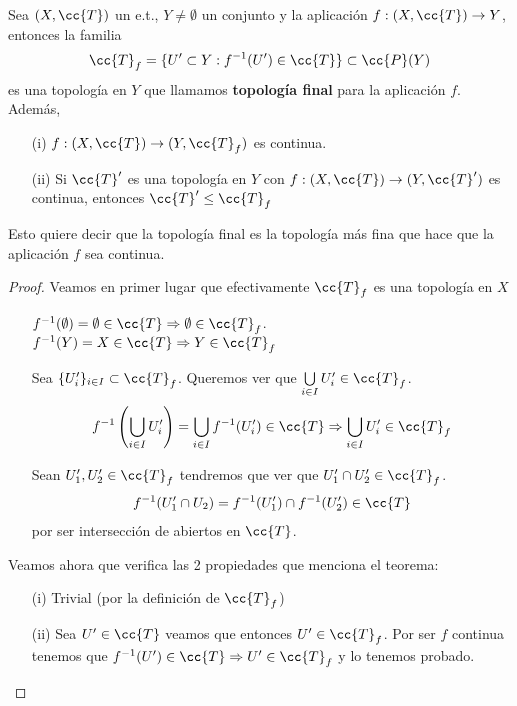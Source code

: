 \begin{teo}
    Sea $(X, \cc{T})$ un e.t., $Y\neq \emptyset$ un conjunto y la aplicación $f:(X, \cc{T})\to Y$, entonces la familia
    \begin{gather*}
        \cc{T}_f = \{U'\subset Y : f^{-1}(U')\in \cc{T}\}\subset \cc{P}(Y)
    \end{gather*}
    es una topología en $Y$ que llamamos \textbf{topología final} para la aplicación $f$. Además,
    \begin{enumerate}
        \item[(i)] $f:(X, \cc{T})\to (Y, \cc{T}_f)$ es continua.
        \item[(ii)] Si $\cc{T}'$ es una topología en $Y$ con $f:(X, \cc{T})\to (Y, \cc{T}')$ es continua, entonces $\cc{T}'\leq \cc{T}_f$
    \end{enumerate}
    Esto quiere decir que la topología final es la topología más fina que hace que la aplicación $f$ sea continua.
    \begin{proof}
        Veamos en primer lugar que efectivamente $\cc{T}_f$ es una topología en $X$
        \begin{enumerate}
            \item[\apuntar{A1}] $f^{-1}(\emptyset)=\emptyset \in \cc{T} \Rightarrow \emptyset\in \cc{T}_f$. $f^{-1}(Y)=X\in \cc{T}\Rightarrow Y \in \cc{T}_f$
            \item[\apuntar{A2}] Sea $\{U_i'\}_{i\in I}\subset \cc{T}_f$. Queremos ver que $\bigcup\limits_{i\in I}U_i'\in \cc{T}_f$.
            \begin{gather*}
                f^{-1}\left(\bigcup\limits_{i\in I}U_i'\right) = \bigcup\limits_{i\in I} f^{-1}(U_i')\in \cc{T} \Rightarrow \bigcup\limits_{i\in I}U_i'\in \cc{T}_f
            \end{gather*}
            \item[\apuntar{A3}] Sean $U_1', U_2'\in \cc{T}_f$ tendremos que ver que $U_1'\cap U_2'\in \cc{T}_f$.
            \begin{gather*}
                f^{-1}(U_1'\cap U_2)=f^{-1}(U_1')\cap f^{-1}(U_2')\in \cc{T}
            \end{gather*}
            por ser intersección de abiertos en $\cc{T}$.
        \end{enumerate}
        Veamos ahora que verifica las 2 propiedades que menciona el teorema:
        \begin{enumerate}
            \item[(i)] Trivial (por la definición de $\cc{T}_f$)
            \item[(ii)] Sea $U'\in \cc{T}$ veamos que entonces $U'\in \cc{T}_f$. Por ser $f$ continua tenemos que $f^{-1}(U')\in \cc{T}\Rightarrow U'\in \cc{T}_f$ y lo tenemos probado.
        \end{enumerate}
    \end{proof}
\end{teo}

